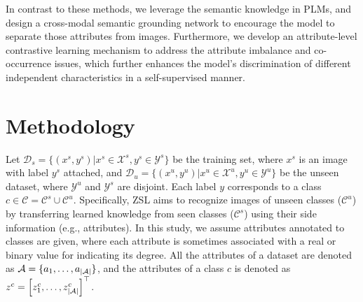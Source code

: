 \documentclass[letterpaper]{article} \usepackage{aaai23}  \usepackage{times}  \usepackage{helvet}  \usepackage{courier}  \usepackage[hyphens]{url}  \usepackage{graphicx} \urlstyle{rm} \def\UrlFont{\rm}  \usepackage{natbib}  \usepackage{caption} \frenchspacing  \setlength{\pdfpagewidth}{8.5in}  \setlength{\pdfpageheight}{11in}  \usepackage{algorithm}
\newcommand{\wen}[1]{{\color{black}#1}}
\newcommand{\fy}[1]{{\color{black}#1}}
\begin{document}
\fy{In contrast to these methods}, we leverage the semantic knowledge in PLMs, and design a cross-modal semantic grounding network to encourage the model to separate those attributes from images.
Furthermore, we develop an attribute-level contrastive learning mechanism to  address the attribute imbalance and co-occurrence issues, which further enhances the model's \fy{discrimination of} different independent characteristics in a self-supervised manner.




\section{Methodology}
Let $\mathcal{D}_{s} = \{(x^s, y^s) | x^s \in \mathcal{X}^s, y^s \in \mathcal{Y}^s\}$ be the training set, where $x^s$ is an image with label $y^s$ attached, and $\mathcal{D}_{u} = \{(x^u, y^u) | x^u \in \mathcal{X}^u, y^u \in \mathcal{Y}^u\}$ be the unseen dataset, where 
\wen{$\mathcal{Y}^u$ and $\mathcal{Y}^{s}$ are disjoint.}
Each label $y$ corresponds to a class {$c \in \mathcal{C}=\mathcal{C}^{s} \cup \mathcal{C}^{u}$.}
Speciﬁcally, ZSL aims to recognize images of 
unseen classes ($\mathcal{C}^{u}$) by transferring learned knowledge from seen classes ($\mathcal{C}^{s}$) using their {side information} (e.g., attributes).
{In this study, we assume attributes annotated to classes are given, where each attribute is sometimes associated with a real or binary value for indicating its degree.
All the attributes of a dataset are denoted as $\mathcal{A}=\{a_1,\ldots,a_\wen{|\mathcal{A}|}\}$, 
\wen{and} 
the attributes of a class $c$ is denoted as $z^{c}=\left[z_{1}^{c}, \ldots, z^{c}_\wen{|\mathcal{A}|}\right]^{\top}$.}
\end{document}
